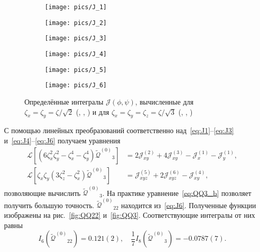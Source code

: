 \documentclass[a4paper,12pt]{article}
\newcommand{\QQ}{\ensuremath{\tilde{\mathcal{Q}}^{(0)}}}
\begin{document}
\begin{figure}
    \centering
    \begin{subfigure}[b]{.5\linewidth}
        \centering
        \texttt{[image: pics/J\_1]}
    	\subcaption{}\label{fig:J_1}
    \end{subfigure}%
    \begin{subfigure}[b]{.5\linewidth}
        \centering
        \texttt{[image: pics/J\_2]}
    	\subcaption{}\label{fig:J_2}
    \end{subfigure}
    \begin{subfigure}[b]{.5\linewidth}
        \centering
        \texttt{[image: pics/J\_3]}
    	\subcaption{}\label{fig:J_3}
    \end{subfigure}%
    \begin{subfigure}[b]{.5\linewidth}
        \centering
        \texttt{[image: pics/J\_4]}
    	\subcaption{}\label{fig:J_4}
    \end{subfigure}
    \begin{subfigure}[b]{.5\linewidth}
        \centering
        \texttt{[image: pics/J\_5]}
    	\subcaption{}\label{fig:J_5}
    \end{subfigure}%
    \begin{subfigure}[b]{.5\linewidth}
        \centering
        \texttt{[image: pics/J\_6]}
    	\subcaption{}\label{fig:J_6}
    \end{subfigure}
    \caption{Определённые интегралы \(\mathcal{J}(\phi,\psi)\),
        вычисленные для \(\zeta_x=\zeta_y=\zeta/\sqrt2\) (, , )
        и для \(\zeta_x=\zeta_y=\zeta_z=\zeta/\sqrt3\) (, , ) }
    \label{fig:J_all}
\end{figure}

С помощью линейных преобразований соответственно над~\eqref{eq:J1}--\eqref{eq:J3} и~\eqref{eq:J4}--\eqref{eq:J6}
получаем уравнения
\begin{align}
    \mathcal{L}\left[ \left( 6\zeta_x^2\zeta_y^2 - \zeta_x^4 - \zeta_y^4 \right)\QQ_3 \right]
        &= 2\mathcal{J}_{xy}^{(2)} + 4\mathcal{J}_{xy}^{(3)} - \mathcal{J}_{x}^{(1)} - \mathcal{J}_{y}^{(1)}, \label{eq:QQ3_a}\\
    \mathcal{L}\left[ \zeta_x\zeta_y\left( 3\zeta_z^2 - \zeta_x^2 \right)\QQ_3 \right]
        &= \mathcal{J}_{xyz}^{(5)} + 2\mathcal{J}_{xyz}^{(6)} - \mathcal{J}_{xy}^{(4)}, \label{eq:QQ3_b}
\end{align}
позволяющие вычислить \(\QQ_3\).
На практике уравнение~\eqref{eq:QQ3_b} позволяет получить большую точность.
\(\QQ_{22}\) находится из~\eqref{eq:J6}.
Полученные функции изображены на рис.~\ref{fig:QQ22} и~\ref{fig:QQ3}.
Соответствующие интегралы от них равны
\begin{equation}\label{eq:gamma8b}
    I_6(\QQ_{22}) = 0.121(2), \quad \frac17 I_8(\QQ_3) = -0.0787(7).
\end{equation}
\end{document}
